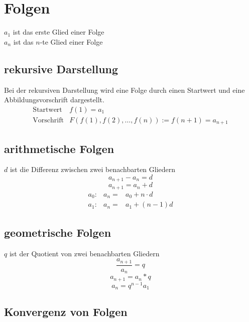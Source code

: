 \section{Folgen}
$a_1$ ist das erste Glied einer Folge\\
$a_n$ ist das $n$-te Glied einer Folge

\subsection{rekursive Darstellung}
Bei der rekursiven Darstellung wird eine Folge durch einen Startwert und eine Abbildungsvorschrift dargestellt. \\
\[ \boxed{ \begin{matrix}
\text{Startwert} & f(1) = a_1 \\
\text{Vorschrift} & F(f(1), f(2), \ldots, f(n)) := f(n + 1) = a_{n + 1}
\end{matrix}} \]

\subsection{arithmetische Folgen}
$d$ ist die Differenz zwischen zwei benachbarten Gliedern\\
\[ \boxed{a_{n+1} - a_n = d} \]
\[ \boxed{a_{n+1} = a_n + d} \]
\[ \boxed{ \begin{matrix} 
a_0 :& a_n =& a_0 + n \cdot d \\
a_1 :& a_n =& a_1 + (n - 1)d 
\end{matrix}}\]

\subsection{geometrische Folgen}
$q$ ist der Quotient von zwei benachbarten Gliedern\\
\[ \boxed{\frac{a_{n+1}}{a_n} = q} \]
\[ \boxed{a_{n+1} = a_n * q} \]
\[ \boxed{a_n = q^{n-1} a_1} \]

\subsection{Konvergenz von Folgen}
